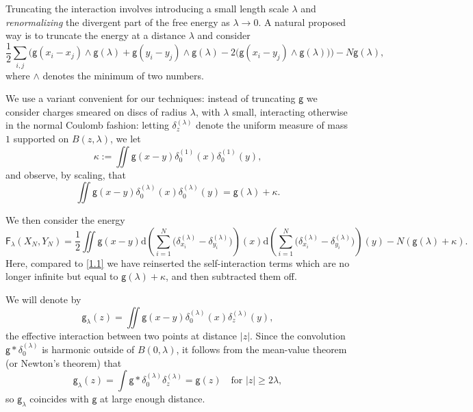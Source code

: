 \documentclass[a4paper,10pt,leqno]{amsart}
\numberwithin{equation}{section}
\newcommand{\dd}{\mathrm{d}}
\def\hal{\frac{1}{2}}
\def\XN{X_N}
\def\YN{Y_N}
\def\g{\mathsf{g}}
\def\F{\mathsf{F}}
\begin{document}
Truncating the interaction involves introducing a small length scale $\lambda$ and \emph{renormalizing} the divergent part of the free energy as $\lambda\to 0$. A natural proposed way is to truncate the energy at a distance $\lambda$ and consider
\begin{equation}\label{eq:F2}
  \hal \sum_{i,j}\bigl(\g(x_i-x_j)\wedge\g(\lambda)+\g(y_i-y_j)\wedge\g(\lambda)-2\bigl(\g(x_i-y_j)\wedge\g(\lambda)\bigr)\bigr)-N\g(\lambda),
\end{equation}
where $\wedge $ denotes the minimum of two numbers.

We use a variant convenient for our techniques: instead of truncating $\g$ we consider charges smeared on discs of radius $\lambda$, with $\lambda$ small, interacting otherwise in the normal Coulomb fashion: letting $\delta_{z}^{(\lambda)}$ denote the uniform measure of mass $1$ supported on $ B(z, \lambda)$, we let
\begin{equation*}
  \kappa:= \iint \g(x-y) \delta_0^{(1)}(x)\delta_0^{(1)}(y),\end{equation*}
and observe, by scaling, that
\begin{equation}\label{geta0}\iint \g(x-y) \delta_0^{(\lambda)} (x) \delta_0^{(\lambda)}(y)= \g(\lambda)+ \kappa.\end{equation}

We then consider the energy
\begin{equation}\label{eq:F3}
  \F_\lambda(\XN, \YN)= \hal \iint \g(x-y) \dd\left( \sum_{i=1}^N \bigl(\delta_{x_i}^{(\lambda)}-\delta_{y_i}^{(\lambda)}\bigr)\right)(x)
  \dd\left( \sum_{i=1}^N \bigl(\delta_{x_i}^{(\lambda)}-\delta_{y_i}^{(\lambda)}\bigr)\right)(y) - N ( \g( \lambda)+\kappa).
\end{equation}
Here, compared to \eqref{1.1} we have reinserted the self-interaction terms which are no longer infinite but equal to $\g(\lambda) + \kappa$,
and then subtracted them off.

We will denote by
\begin{equation} \label{eq:defgeta} \g_\lambda(z)= \iint \g(x-y) \delta_0^{(\lambda)}(x)\delta_z^{(\lambda)} (y),
\end{equation} the effective interaction between two points at distance $|z|$. Since the convolution $\g* \delta_0^{(\lambda)}$ is harmonic outside of $B(0, \lambda)$, it follows from the mean-value theorem (or Newton's theorem) that
\begin{equation*} \g_\lambda(z)= \int \g* \delta^{(\lambda)}_0 \delta_z^{(\lambda)} = \g(z) \quad \text{for } |z|\ge 2\lambda,\end{equation*} so $\g_\lambda$ coincides with $\g$ at large enough distance.
\end{document}
